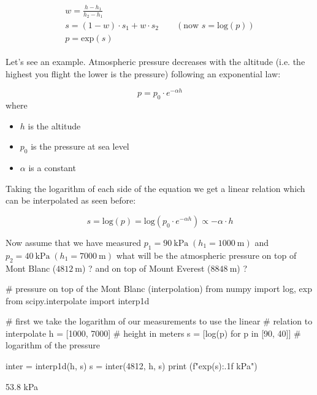 \begin{align}
\label{eq:log_interp}
\begin{gathered}
w = \frac{h - h_1}{h_2 - h_1} \\
s = (1 - w)\cdot s_1 + w \cdot s_2\qquad (\textrm{now } s = \textrm{log}(p))\\
p = \textrm{exp}(s)
\end{gathered}
\end{align}

Let's see an example. Atmospheric pressure decreases with the altitude (i.e. the highest you flight the lower is the pressure) following an exponential law:

\begin{equation}
p = p_0\cdot e^{-\alpha h}
\end{equation}
where
\begin{itemize}
\tightlist
\item $h$ is the altitude
\item $p_0$ is the pressure at sea level
\item $\alpha$ is a constant
\end{itemize}

Taking the logarithm of each side of the equation we get a linear relation which can be interpolated as seen before:

\begin{equation}
s = \mathrm{log}(p) = \mathrm{log}(p_0\cdot e^{-\alpha h})\propto - \alpha \cdot h
\end{equation}

Now assume that we have measured
$p_1 = 90~\mathrm{kPa}\;(h_1 = 1000~\mathrm{m})$ and $p_2 = 40~\mathrm{kPa}\;(h_1 = 7000~\mathrm{m})$ what will be the atmospheric pressure on top of Mont Blanc ($4812~\mathrm{m}$) ? and on top of Mount Everest ($8848~\mathrm{m}$) ?

\begin{ipython}
# pressure on top of the Mont Blanc (interpolation)
from numpy import log, exp
from scipy.interpolate import interp1d

# first we take the logarithm of our measurements to use the linear
# relation to interpolate
h = [1000, 7000] # height in meters
s = [log(p) for p in [90, 40]] # logarithm of the pressure

inter = interp1d(h, s)
s = inter(4812, h, s)
print (f"{exp(s):.1f} kPa")
\end{ipython}
\begin{ioutput}
53.8 kPa
\end{ioutput}

